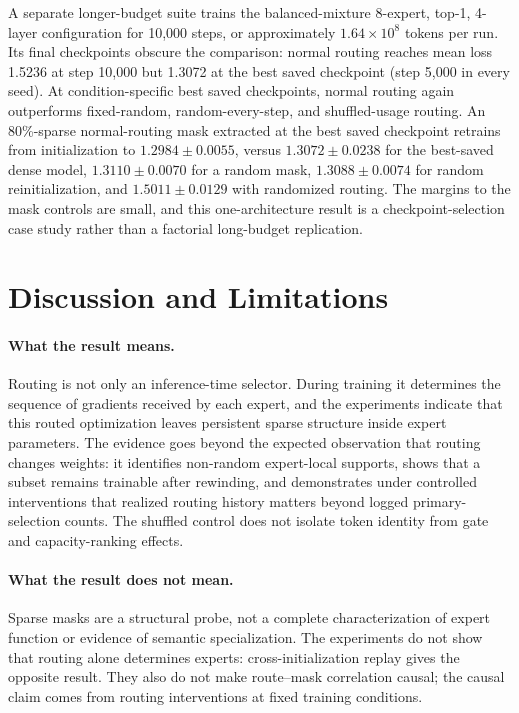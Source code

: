 \documentclass{article}
\begin{document}
A separate longer-budget suite trains the balanced-mixture 8-expert, top-1,
4-layer configuration for 10,000 steps, or approximately
$1.64\times10^8$ tokens per run. Its final checkpoints obscure the comparison:
normal routing reaches mean loss 1.5236 at step 10,000 but 1.3072 at the best
saved checkpoint (step 5,000 in every seed). At condition-specific best saved
checkpoints, normal routing again outperforms fixed-random,
random-every-step, and shuffled-usage routing. An 80\%-sparse normal-routing
mask extracted at the best saved checkpoint retrains from initialization to
$1.2984\pm0.0055$, versus $1.3072\pm0.0238$ for the best-saved dense model,
$1.3110\pm0.0070$ for a random mask, $1.3088\pm0.0074$ for random
reinitialization, and $1.5011\pm0.0129$ with randomized routing. The margins to
the mask controls are small, and this one-architecture result is a
checkpoint-selection case study rather than a factorial long-budget
replication.

\section{Discussion and Limitations}
\label{sec:discussion}

\paragraph{What the result means.}
Routing is not only an inference-time selector. During training it determines
the sequence of gradients received by each expert, and the experiments indicate
that this routed optimization leaves persistent sparse structure inside expert
parameters. The evidence goes beyond the expected observation that routing
changes weights: it identifies non-random expert-local supports, shows that a
subset remains trainable after rewinding, and demonstrates under controlled
interventions that realized routing history matters beyond logged
primary-selection counts. The shuffled control does not isolate token identity
from gate and capacity-ranking effects.

\paragraph{What the result does not mean.}
Sparse masks are a structural probe, not a complete characterization of expert
function or evidence of semantic specialization. The experiments do not show
that routing alone determines experts: cross-initialization replay gives the
opposite result. They also do not make route--mask correlation causal; the
causal claim comes from routing interventions at fixed training conditions.
\end{document}
